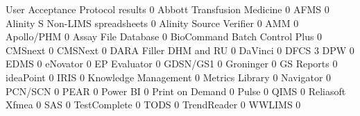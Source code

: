 \documentclass{article}
\begin{document}
\begin{Schunk}
\begin{Soutput}
                                  User Acceptance Protocol results
                                                                 0
  Abbott Transfusion Medicine                                    0
  AFMS                                                           0
  Alinity S Non-LIMS spreadsheets                                0
  Alinity Source Verifier                                        0
  AMM                                                            0
  Apollo/PHM                                                     0
  Assay File Database                                            0
  BioCommand Batch Control Plus                                  0
  CMSnext                                                        0
  CMSNext                                                        0
  DARA Filler DHM and RU                                         0
  DaVinci                                                        0
  DFCS                                                           3
  DPW                                                            0
  EDMS                                                           0
  eNovator                                                       0
  EP Evaluator                                                   0
  GDSN/GS1                                                       0
  Groninger                                                      0
  GS Reports                                                     0
  ideaPoint                                                      0
  IRIS                                                           0
  Knowledge Management                                           0
  Metrics Library                                                0
  Navigator                                                      0
  PCN/SCN                                                        0
  PEAR                                                           0
  Power BI                                                       0
  Print on Demand                                                0
  Pulse                                                          0
  QIMS                                                           0
  Reliasoft Xfmea                                                0
  SAS                                                            0
  TestComplete                                                   0
  TODS                                                           0
  TrendReader                                                    0
  WWLIMS                                                         0
                                 

\end{Soutput}
\end{Schunk}
\end{document}

